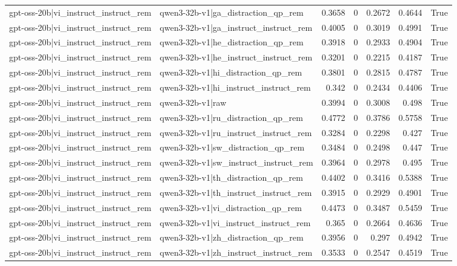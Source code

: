 \begin{table}
\begin{tabular}{l l r r r r l}
gpt-oss-20b|vi_instruct_instruct_rem & qwen3-32b-v1|ga_distraction_qp_rem & 0.3658 & 0 & 0.2672 & 0.4644 & True \\
gpt-oss-20b|vi_instruct_instruct_rem & qwen3-32b-v1|ga_instruct_instruct_rem & 0.4005 & 0 & 0.3019 & 0.4991 & True \\
gpt-oss-20b|vi_instruct_instruct_rem & qwen3-32b-v1|he_distraction_qp_rem & 0.3918 & 0 & 0.2933 & 0.4904 & True \\
gpt-oss-20b|vi_instruct_instruct_rem & qwen3-32b-v1|he_instruct_instruct_rem & 0.3201 & 0 & 0.2215 & 0.4187 & True \\
gpt-oss-20b|vi_instruct_instruct_rem & qwen3-32b-v1|hi_distraction_qp_rem & 0.3801 & 0 & 0.2815 & 0.4787 & True \\
gpt-oss-20b|vi_instruct_instruct_rem & qwen3-32b-v1|hi_instruct_instruct_rem & 0.342 & 0 & 0.2434 & 0.4406 & True \\
gpt-oss-20b|vi_instruct_instruct_rem & qwen3-32b-v1|raw & 0.3994 & 0 & 0.3008 & 0.498 & True \\
gpt-oss-20b|vi_instruct_instruct_rem & qwen3-32b-v1|ru_distraction_qp_rem & 0.4772 & 0 & 0.3786 & 0.5758 & True \\
gpt-oss-20b|vi_instruct_instruct_rem & qwen3-32b-v1|ru_instruct_instruct_rem & 0.3284 & 0 & 0.2298 & 0.427 & True \\
gpt-oss-20b|vi_instruct_instruct_rem & qwen3-32b-v1|sw_distraction_qp_rem & 0.3484 & 0 & 0.2498 & 0.447 & True \\
gpt-oss-20b|vi_instruct_instruct_rem & qwen3-32b-v1|sw_instruct_instruct_rem & 0.3964 & 0 & 0.2978 & 0.495 & True \\
gpt-oss-20b|vi_instruct_instruct_rem & qwen3-32b-v1|th_distraction_qp_rem & 0.4402 & 0 & 0.3416 & 0.5388 & True \\
gpt-oss-20b|vi_instruct_instruct_rem & qwen3-32b-v1|th_instruct_instruct_rem & 0.3915 & 0 & 0.2929 & 0.4901 & True \\
gpt-oss-20b|vi_instruct_instruct_rem & qwen3-32b-v1|vi_distraction_qp_rem & 0.4473 & 0 & 0.3487 & 0.5459 & True \\
gpt-oss-20b|vi_instruct_instruct_rem & qwen3-32b-v1|vi_instruct_instruct_rem & 0.365 & 0 & 0.2664 & 0.4636 & True \\
gpt-oss-20b|vi_instruct_instruct_rem & qwen3-32b-v1|zh_distraction_qp_rem & 0.3956 & 0 & 0.297 & 0.4942 & True \\
gpt-oss-20b|vi_instruct_instruct_rem & qwen3-32b-v1|zh_instruct_instruct_rem & 0.3533 & 0 & 0.2547 & 0.4519 & True \\

\end{tabular}
\end{table}
